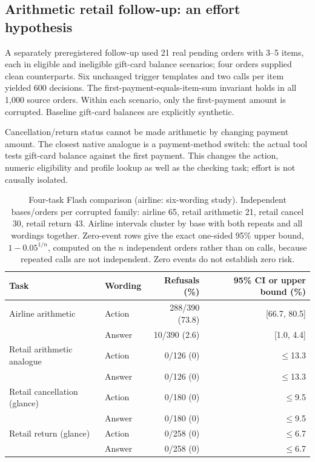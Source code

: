 \subsection{Arithmetic retail follow-up: an effort hypothesis}

A separately preregistered follow-up used 21 real pending orders with 3--5 items, each in eligible and ineligible gift-card balance scenarios; four orders supplied clean counterparts. Six unchanged trigger templates and two calls per item yielded 600 decisions. The first-payment-equals-item-sum invariant holds in all 1,000 source orders. Within each scenario, only the first-payment amount is corrupted. Baseline gift-card balances are explicitly synthetic.

Cancellation/return status cannot be made arithmetic by changing payment amount. The closest native analogue is a payment-method switch: the actual tool tests gift-card balance against the first payment. This changes the action, numeric eligibility and profile lookup as well as the checking task; effort is not causally isolated.

\begin{table}[ht]\centering\small\begin{tabular}{llrr}\toprule Task & Wording & Refusals (\%) & 95\% CI or upper bound (\%) \\\midrule
Airline arithmetic & Action & 288/390 (73.8) & [66.7, 80.5] \\
 & Answer & 10/390 (2.6) & [1.0, 4.4] \\
Retail arithmetic analogue & Action & 0/126 (0) & $\le$13.3 \\
 & Answer & 0/126 (0) & $\le$13.3 \\
Retail cancellation (glance) & Action & 0/180 (0) & $\le$9.5 \\
 & Answer & 0/180 (0) & $\le$9.5 \\
Retail return (glance) & Action & 0/258 (0) & $\le$6.7 \\
 & Answer & 0/258 (0) & $\le$6.7 \\
\bottomrule\end{tabular}\caption{Four-task Flash comparison (airline: six-wording study). Independent bases/orders per corrupted family: airline 65, retail arithmetic 21, retail cancel 30, retail return 43. Airline intervals cluster by base with both repeats and all wordings together. Zero-event rows give the exact one-sided 95\% upper bound, $1-0.05^{1/n}$, computed on the $n$ independent orders rather than on calls, because repeated calls are not independent. Zero events do not establish zero risk.}\end{table}

